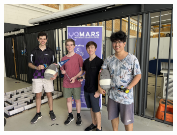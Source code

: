\documentclass[a4paper,12pt]{report}
\begin{document}
\begin{figure}[H]
\begin{subfigure}{0.32\linewidth}
    \end{subfigure}
    \begin{subfigure}{0.32\linewidth}
        \includegraphics[width=0.99\linewidth]{prospectus/2024/Photos/MouseWinners.jpg}
    \end{subfigure}
\end{figure}
\end{document}
